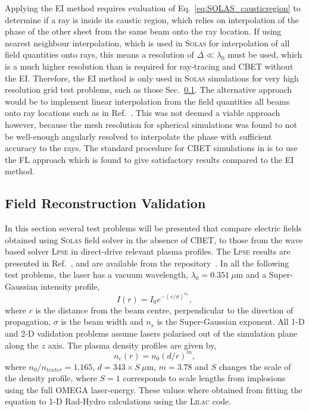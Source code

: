 Applying the \ac{EI} method requires evaluation of Eq.~\ref{eq:SOLAS_causticregion} to determine if a ray is inside its caustic region, which relies on interpolation of the phase of the other sheet from the same beam onto the ray location.
If using nearest neighbour interpolation, which is used in \textsc{Solas} for interpolation of all field quantities onto rays, this means a resolution of $\Delta\ll\lambda_0$ must be used, which is a much higher resolution than is required for ray-tracing and \ac{CBET} without the \ac{EI}.
Therefore, the \ac{EI} method is only used in \textsc{Solas} simulations for very high resolution grid test problems, such as those Sec.~\ref{sec:SOLAS_field_validation}.
The alternative approach would be to implement linear interpolation from the field quantities all beams onto ray locations such as in Ref.~\cite{follett_validation_2022}.
This was not deemed a viable approach however, because the mesh resolution for spherical simulations was found to not be well-enough angularly resolved to interpolate the phase with sufficient accuracy to the rays.
The standard procedure for \ac{CBET} simulations in  is to use the \ac{FL} approach which is found to give satisfactory results compared to the \ac{EI} method.

\subsection{Field Reconstruction Validation}%
\label{sec:SOLAS_field_validation}

In this section several test problems will be presented that compare electric fields obtained using \textsc{Solas} field solver in the absence of \ac{CBET}, to those from the wave based solver \textsc{Lpse} in direct-drive relevant plasma profiles.
The \textsc{Lpse} results are presented in Ref.~\cite{follett_validation_2022}, and are available from the repository~\cite{follett_lpse_2022}.
In all the following test problems, the laser has a vacuum wavelength, $\lambda_0=0.351\ \mu\text{m}$ and a Super-Gaussian intensity profile,
\begin{equation}
    I(r) = I_0 e^{-(r/\sigma)^{n_s}},
\end{equation}
where $r$ is the distance from the beam centre, perpendicular to the direction of propagation, $\sigma$ is the beam width and $n_s$ is the Super-Gaussian exponent.
All 1-D and 2-D validation problems assume lasers polarised out of the simulation plane along the $z$ axis.
The plasma density profiles are given by,
\begin{equation}%
    \label{eq:SOLAS_test_ne}
    n_e(r) = n_0 (d/r)^{m},
\end{equation}
where $n_0/n_{text{cr}} = 1.165$, $d = 343\times S\ \mu\text{m}$, $m=3.78$ and $S$ changes the scale of the density profile, where $S=1$ corresponds to scale lengths from implosions using the full OMEGA laser-energy.
These values where obtained from fitting the equation to 1-D \ac{Rad-Hydro} calculations using the \textsc{Lilac} code.

